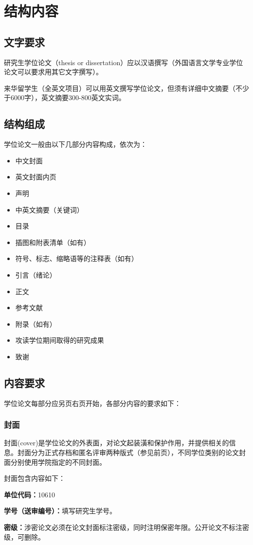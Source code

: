 \chapter{结构内容}
\section{文字要求}
研究生学位论文（thesis or dissertation）应以汉语撰写（外国语言文学专业学位论文可以要求用其它文字撰写）。

来华留学生（全英文项目）可以用英文撰写学位论文，但须有详细中文摘要（不少于6000字），英文摘要300-800英文实词。
\section{结构组成}
学位论文一般由以下几部分内容构成，依次为：
\begin{itemize}
\item	中文封面 
\item	英文封面内页
\item	声明
\item	中英文摘要（关键词） 
\item	目录
\item	插图和附表清单（如有）
\item	符号、标志、缩略语等的注释表（如有）
\item	引言（绪论）
\item	正文
\item	参考文献
\item	附录（如有）
\item	攻读学位期间取得的研究成果
\item	致谢
\end{itemize}
\section{内容要求}
学位论文每部分应另页右页开始，各部分内容的要求如下：
\subsection{封面}
封面(cover)是学位论文的外表面，对论文起装潢和保护作用，并提供相关的信息。封面分为正式存档和匿名评审两种版式（参见前页），不同学位类别的论文封面分别使用学院指定的不同封面。

封面包含内容如下：

\textbf{单位代码：}10610

\textbf{学号（送审编号）：}填写研究生学号。

\textbf{密级：}涉密论文必须在论文封面标注密级，同时注明保密年限。公开论文不标注密级，可删除。

